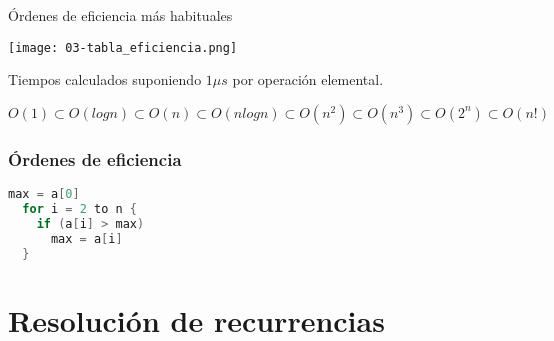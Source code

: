 \begin{frame}[c]{Órdenes de eficiencia más habituales}
  \begin{center}
    \texttt{[image: 03-tabla\_eficiencia.png]}
  \end{center}
  Tiempos calculados suponiendo $1 \mu{}s$ por operación elemental.

  \begin{math}
    O(1) \subset O(log n) \subset O(n) \subset O(n log n) \subset
    O(n^2) \subset O(n^3) \subset O(2^n) \subset O(n!)
  \end{math}
\end{frame}

\begin{frame}[fragile]
  \frametitle{Órdenes de eficiencia}

  \begin{lstlisting}[language=C]
  max = a[0]
  for i = 2 to n {
    if (a[i] > max)
      max = a[i]
  }
  \end{lstlisting}
\end{frame}

\section{Resolución de recurrencias}

\begin{frame}[c]{}
\end{frame}

